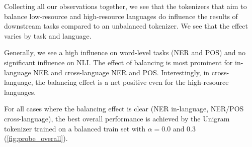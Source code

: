 Collecting all our observations together, we see that the tokenizers that aim to balance low-resource and high-resource languages do influence the results of downstream tasks compared to an unbalanced tokenizer. We see that the effect varies by task and language. 

Generally, we see a high influence on word-level tasks (NER and POS) and no significant influence on NLI. The effect of balancing is most prominent for in-language NER and cross-language NER and POS. Interestingly, in cross-language, the balancing effect is a net positive even for the high-resource languages.

For all cases where the balancing effect is clear (NER in-language, NER/POS cross-language), the best overall performance is achieved by the Unigram tokenizer trained on a balanced train set with $\alpha=0.0\text{ and }0.3$ (\autoref{fig:probe_overall}).


